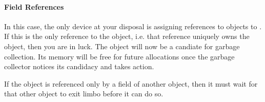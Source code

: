 \paragraph{Field References}

In this case, the only device at your disposal is assigning references to
objects to . If this is the only reference to the object, i.e. that reference
uniquely owns the object, then you are in luck. The object will now be a candiate
for garbage collection. Its memory will be free for future allocations once the
garbage collector notices its candidacy and takes action.

If the object is referenced only by a
field of another object, then it must wait for that other object to exit limbo
before it can do so. 











